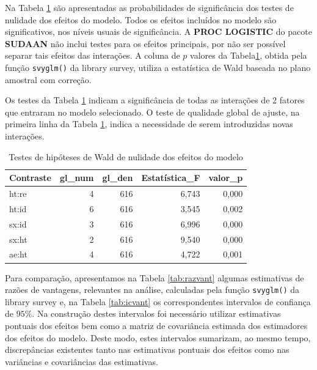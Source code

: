 \documentclass[]{book}
\theoremstyle{definition}
\theoremstyle{definition}
\theoremstyle{definition}
\theoremstyle{remark}
\begin{document}
Na Tabela \ref{tab:testmodlogit} são apresentadas as probabilidades de
significância dos testes de nulidade dos efeitos do modelo. Todos os
efeitos incluídos no modelo são significativos, nos níveis usuais de
significância. A \textbf{PROC LOGISTIC} do pacote \textbf{SUDAAN} não
inclui testes para os efeitos principais, por não ser possível separar
tais efeitos das interações. A coluna de \(p\) valores da
Tabela\ref{tab:testmodlogit}, obtida pela função \texttt{svyglm()} da
library survey, utiliza a estatística de Wald baseada no plano amostral
com correção.

Os testes da Tabela \ref{tab:testmodlogit} indicam a significância de
todas as interações de 2 fatores que entraram no modelo selecionado. O
teste de qualidade global de ajuste, na primeira linha da Tabela
\ref{tab:testmodlogit}, indica a necessidade de serem introduzidas novas
interações.

\begin{table}

\caption{\label{tab:testmodlogit}Testes de hipóteses de Wald de nulidade dos efeitos do modelo}
\centering
\begin{tabular}[t]{lrrrr}
\toprule
Contraste & gl\_num & gl\_den & Estatística\_F & valor\_p\\
\midrule
ht:re & 4 & 616 & 6,743 & 0,000\\
ht:id & 6 & 616 & 3,545 & 0,002\\
sx:id & 3 & 616 & 6,996 & 0,000\\
sx:ht & 2 & 616 & 9,540 & 0,000\\
ae:ht & 4 & 616 & 4,722 & 0,001\\
\bottomrule
\end{tabular}
\end{table}

Para comparação, apresentamos na Tabela \ref{tab:razvant} algumas
estimativas de razões de vantagens, relevantes na análise, calculadas
pela função \texttt{svyglm()} da library survey e, na Tabela
\ref{tab:icvant} os correspondentes intervalos de confiança de \(95\%\).
Na construção destes intervalos foi necessário utilizar estimativas
pontuais dos efeitos bem como a matriz de covariância estimada dos
estimadores dos efeitos do modelo. Deste modo, estes intervalos
sumarizam, ao mesmo tempo, discrepâncias existentes tanto nas
estimativas pontuais dos efeitos como nas variâncias e covariâncias das
estimativas.
\end{document}
